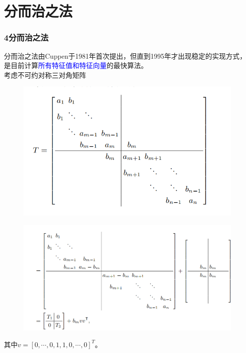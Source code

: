 \documentclass[notheorems,serif]{beamer}
\begin{document}
\section{分而治之法}
\begin{frame}
\frametitle{4\qquad 分而治之法}

分而治之法由Cuppen于1981年首次提出，但直到1995年才出现稳定的实现方式，是目前计算\textcolor{blue}{所有特征值和特征向量}的最快算法。\\
考虑不可约对称三对角矩阵
\begin{figure}
	\begin{center}
		\includegraphics[scale=0.5]{figurest/figure_4.png}
	\end{center}
\end{figure}
\end{frame}
\begin{frame}
\begin{figure}
	\begin{center}
		\includegraphics[scale=0.39]{figurest/figure_5.png}
	\end{center}
\end{figure}
其中$v=[0,\cdots ,0,1,1,0,\cdots ,0]^T$。
\end{frame}
\end{document}
